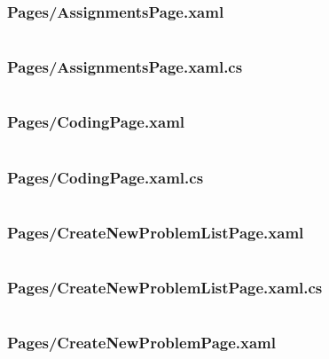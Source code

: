 \documentclass[a4paper]{report}
\begin{document}
\inputminted{csharp}{"../src/Algorithm Dynamics/Pages/AssignmentDetailsPage.xaml.cs"}

\subsubsection{Pages/AssignmentsPage.xaml}

\inputminted{xml}{"../src/Algorithm Dynamics/Pages/AssignmentsPage.xaml"}

\subsubsection{Pages/AssignmentsPage.xaml.cs}

\inputminted{csharp}{"../src/Algorithm Dynamics/Pages/AssignmentsPage.xaml.cs"}

\subsubsection{Pages/CodingPage.xaml}

\inputminted{xml}{"../src/Algorithm Dynamics/Pages/CodingPage.xaml"}

\subsubsection{Pages/CodingPage.xaml.cs}

\inputminted{csharp}{"../src/Algorithm Dynamics/Pages/CodingPage.xaml.cs"}

\subsubsection{Pages/CreateNewProblemListPage.xaml}

\inputminted{xml}{"../src/Algorithm Dynamics/Pages/CreateNewProblemListPage.xaml"}

\subsubsection{Pages/CreateNewProblemListPage.xaml.cs}
\label{subsubsec:createnewproblemlistpage
}

\inputminted{csharp}{"../src/Algorithm Dynamics/Pages/CreateNewProblemListPage.xaml.cs"}

\subsubsection{Pages/CreateNewProblemPage.xaml}
\end{document}
